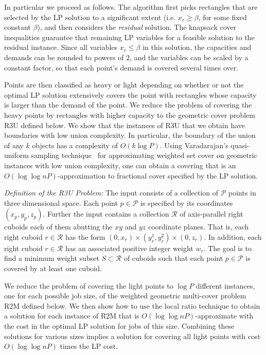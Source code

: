 \documentclass[11pt]{article}
\begin{document}
In particular we proceed as follows.
The algorithm first picks rectangles that are selected by
the LP solution to a significant extent (i.e. $x_r \geq \beta$, for some fixed constant $\beta$),
and then considers the {\em residual} solution.
The knapsack cover inequalities guarantee that remaining LP variables for a feasible solution 
to the residual instance. Since all variables $x_r \leq \beta$ in this solution,
the capacities and demands can be rounded to powers of $2$, and the variables can be scaled by
a constant factor, so that each point's demand is covered several times over. 


Points are then classified as heavy or light depending on whether or not
the optimal LP solution extensively covers the point with rectangles whose capacity
is larger than the demand of the point. 
We reduce the problem of covering the heavy points by rectangles with higher capacity to the
geometric cover problem R3U defined below. 
We show that the instances of R3U that we obtain 
have boundaries with low union complexity.
In particular, the boundary of the union of any $k$ objects 
has a complexity of $O(k \log P)$.
Using Varadarajan's quasi-uniform sampling technique~\cite{Varadarajan09} 
for approximating weighted set cover on geometric instances with low union 
complexity, one can obtain a covering that is  an
$O(\log \log nP)$-approximation to fractional cover specified by the
LP solution.



\medskip

{\em Definition of the R3U Problem:}
The input consists of a collection of ${\mathcal P}$ points in three dimensional space.
Each point $p\in {\mathcal P}$ is specified by its coordinates $(x_p,y_p, z_p)$.
Further the input contains a collection ${\mathcal R}$ of axis-parallel right cuboids
each of them abutting the $xy$ and $yz$ coordinate planes. 
That is, each right cuboid $r\in {\mathcal R}$ has the form  
$(0,x_r) \times (y_r^1,y_r^2) \times (0, z_r)$. 
In addition, each right cuboid $r \in {\mathcal R}$ has an associated positive 
integer weight $w_r$.
The goal is to find a minimum weight subset $S \subset {\mathcal R}$ of cuboids
such that each point $p \in {\mathcal P}$ is covered by at least one cuboid.


\medskip

We reduce the problem of covering the light points to $\log P$
different instances, one for each possible job size, 
of the weighted geometric multi-cover problem R2M defined below. 
We then show how to use the local ratio technique to obtain a solution
for each instance of R2M that is $O(\log \log nP)$-approximate with the cost in the
optimal LP solution for jobs of this size. Combining these solutions for various sizes
implies a solution for covering all light points with cost $O(\log \log nP)$ times the LP cost.
\end{document}
